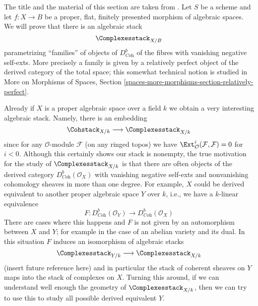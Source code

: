 \noindent
The title and the material of this section are taken from
\cite{lieblich-complexes}. Let $S$ be a scheme and let
$f : X \to B$ be a proper, flat, finitely presented morphism
of algebraic spaces. We will prove that there is an
algebraic stack
$$
\Complexesstack_{X/B}
$$
parametrizing ``families'' of objects of $D^b_{\textit{Coh}}$
of the fibres with vanishing negative self-exts. More precisely
a family is given by a relatively perfect object of the derived
category of the total space; this somewhat technical notion
is studied in
More on Morphisms of Spaces, Section
\ref{spaces-more-morphisms-section-relatively-perfect}.

\medskip\noindent
Already if $X$ is a proper algebraic
space over a field $k$ we obtain a very interesting algebraic stack.
Namely, there is an embedding
$$
\Cohstack_{X/k} \longrightarrow \Complexesstack_{X/k}
$$
since for any $\mathcal{O}$-module $\mathcal{F}$ (on any ringed topos)
we have $\Ext^i_\mathcal{O}(\mathcal{F}, \mathcal{F}) = 0$ for $i < 0$.
Although this certainly shows our stack is nonempty, the
true motivation for the study of $\Complexesstack_{X/k}$
is that there are often objects of the derived category
$D^b_{\textit{Coh}}(\mathcal{O}_X)$ with vanishing negative self-exts
and nonvanishing cohomology sheaves in more than one degree.
For example, $X$ could be derived equivalent to another
proper algebraic space $Y$ over $k$, i.e., we have a
$k$-linear equivalence
$$
F : D^b_{\textit{Coh}}(\mathcal{O}_Y)
\longrightarrow
D^b_{\textit{Coh}}(\mathcal{O}_X)
$$
There are cases where this happens and $F$ is not given by
an automorphism between $X$ and $Y$; for example in the case
of an abelian variety and its dual. In this situation $F$ induces
an isomorphism of algebraic stacks
$$
\Complexesstack_{Y/k}
\longrightarrow
\Complexesstack_{X/k}
$$
(insert future reference here) and in particular the stack of coherent sheaves
on $Y$ maps into the stack of complexes on $X$. Turning this around,
if we can understand well enough the geometry of
$\Complexesstack_{X/k}$, then we can try to use this to study all possible
derived equivalent $Y$.

